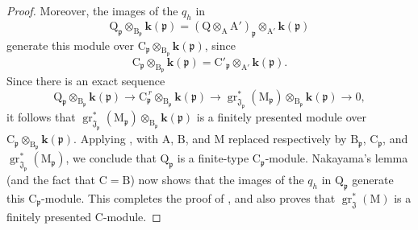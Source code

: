 \begin{proof}
Moreover, the images of the $q_h$ in
\[
  \mathrm{Q}_\mathfrak{p}\otimes_{\mathrm{B}_\mathfrak{p}}\boldsymbol{k}(\mathfrak{p})
  =
  (\mathrm{Q}\otimes_\mathrm{A}\mathrm{A}')_\mathfrak{p}
  \otimes_{\mathrm{A}'}\boldsymbol{k}(\mathfrak{p})
\]
generate this module over $\mathrm{C}_\mathfrak{p}\otimes_{\mathrm{B}_\mathfrak{p}}\boldsymbol{k}(\mathfrak{p})$, since
\[
  \mathrm{C}_\mathfrak{p}\otimes_{\mathrm{B}_\mathfrak{p}}\boldsymbol{k}(\mathfrak{p})
  =
  \mathrm{C}'_\mathfrak{p}\otimes_{\mathrm{A}'}\boldsymbol{k}(\mathfrak{p}).
\]
Since there is an exact sequence
\[
  \mathrm{Q}_\mathfrak{p}\otimes_{\mathrm{B}_\mathfrak{p}}\boldsymbol{k}(\mathfrak{p})
  \longrightarrow
  \mathrm{C}_\mathfrak{p}^{\,r}\otimes_{\mathrm{B}_\mathfrak{p}}\boldsymbol{k}(\mathfrak{p})
  \longrightarrow
  \operatorname{gr}^*_{\mathfrak{J}_\mathfrak{p}}(\mathrm{M}_\mathfrak{p})
  \otimes_{\mathrm{B}_\mathfrak{p}}\boldsymbol{k}(\mathfrak{p})
  \longrightarrow 0,
\]
it follows that $\operatorname{gr}^*_{\mathfrak{J}_\mathfrak{p}}(\mathrm{M}_\mathfrak{p})\otimes_{\mathrm{B}_\mathfrak{p}}\boldsymbol{k}(\mathfrak{p})$ is a finitely presented module over $\mathrm{C}_\mathfrak{p}\otimes_{\mathrm{B}_\mathfrak{p}}\boldsymbol{k}(\mathfrak{p})$. Applying , with $\mathrm{A}$, $\mathrm{B}$, and $\mathrm{M}$ replaced respectively by $\mathrm{B}_\mathfrak{p}$, $\mathrm{C}_\mathfrak{p}$, and $\operatorname{gr}^*_{\mathfrak{J}_\mathfrak{p}}(\mathrm{M}_\mathfrak{p})$, we conclude that $\mathrm{Q}_\mathfrak{p}$ is a finite-type $\mathrm{C}_\mathfrak{p}$-module. Nakayama's lemma (and the fact that $\mathrm{C}=\mathrm{B}$) now shows that the images of the $q_h$ in $\mathrm{Q}_\mathfrak{p}$ generate this $\mathrm{C}_\mathfrak{p}$-module. This completes the proof of , and also proves that $\operatorname{gr}^*_\mathfrak{J}(\mathrm{M})$ is a finitely presented $\mathrm{C}$-module.


\end{proof}
